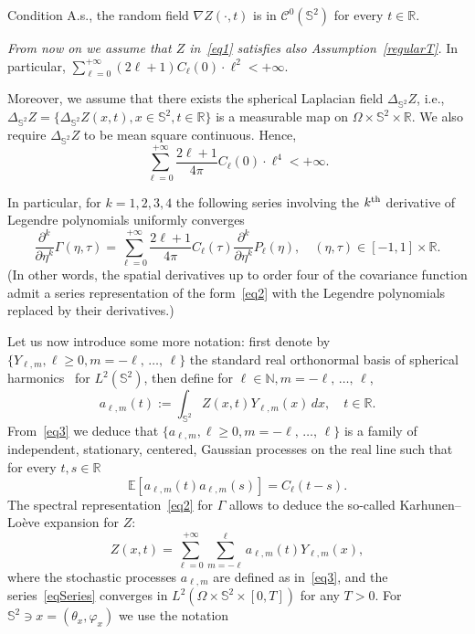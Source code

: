 \documentclass[10pt]{amsart}
\theoremstyle{definition}\newtheorem{defi}[theo]{Definition}\newtheorem{rema}[theo]{Remark}\newtheorem{exam}[theo]{Example}\newtheorem{exem}[theo]{Example}\newtheorem{nota}[theo]{Notation}
\newcommand{\clC}{\mathcal{C}}
\newcommand{\bbS}{\mathbb{S}}
\newcommand{\bbR}{\mathbb{R}}
\newcommand{\bbE}{\mathbb{E}}
\newcommand{\bbN}{\mathbb{N}}
\begin{document}
\begin{enonce}{Condition}\label{regularT}
A.s., the random field $\nabla Z(\cdot,t)$ is in $\clC^0(\bbS^2)$ for every $t\in \bbR$.
\end{enonce}
\emph{From now on we assume that $Z$ in~\eqref{eq1} satisfies also Assumption~\ref{regularT}. } In particular, $\sum_{\ell=0}^{+\infty} (2\ell+1) C_\ell(0) \cdot \ell^2 < +\infty$.

Moreover, we assume that there exists the spherical Laplacian field $\Delta_{\bbS^2} Z$, i.e., $\Delta_{\bbS^2} Z = \{ \Delta_{\bbS^2} Z(x,t), x\in \bbS^2, t\in \bbR\}$ is a measurable map on $\Omega\times \bbS^2\times \bbR$. We also require $\Delta_{\bbS^2} Z$ to be mean square continuous. Hence,
\begin{equation}\label{eqConv}
\sum_{\ell = 0}^{+\infty} \frac{2\ell+1}{4\pi} C_\ell(0) \cdot \ell^4 < +\infty.
\end{equation}

In particular, for $k=1,2,3,4$ the following series involving the $k^{\rm th}$ derivative of Legendre polynomials uniformly converges
\begin{equation}\label{eqDer}
\frac{\partial^k}{\partial \eta^k}\Gamma(\eta, \tau)= \sum_{\ell=0}^{+\infty}
\frac{2\ell+1}{4\pi} C_\ell(\tau) \frac{\partial^k}{\partial \eta^k} P_\ell(\eta),\quad (\eta, \tau) \in [-1,1] \times \bbR.
\end{equation}
(In other words, the spatial derivatives up to order four of the covariance function admit a series representation of the form~\eqref{eq2} with the Legendre polynomials replaced by their derivatives.)



Let us now introduce some more notation: first denote by $\{ Y_{\ell,m}, \ell \ge 0, m=-\ell,\, \dots,\, \ell\}$ the standard real orthonormal basis of spherical harmonics~\cite[Section~3.4]{MaPeCUP} for $ L^2(\bbS^2)$, then define for $\ell\in \bbN, m=-\ell,\,\dots,\,\ell$,
\begin{equation}\label{eq3}
a_{\ell,m}(t) := \int_{\bbS^2} Z(x,t) Y_{\ell,m}(x)\,dx,\quad t\in
\bbR.
\end{equation}
From~\eqref{eq3} we deduce that $\{ a_{\ell,m}, \ell \ge 0, m=-\ell,\,
\dots,\,\ell\}$ is a family of independent, stationary, centered, Gaussian processes on the real line such that for every $t,s \in \bbR$
\begin{equation*}
\bbE[a_{\ell,m}(t) a_{\ell,m}(s)] = C_\ell(t-s).
\end{equation*}
The spectral representation~\eqref{eq2} for $\Gamma$ allows to deduce the so-called Karhunen--Lo\`eve expansion for $Z$:
\begin{equation}\label{eqSeries}
Z(x,t) = \sum_{\ell =0}^{+\infty} \sum_{m=-\ell}^\ell a_{\ell,m}(t) Y_{\ell,m}(x),
\end{equation}
where the stochastic processes $a_{\ell,m}$ are defined as in~\eqref{eq3}, and the series~\eqref{eqSeries} converges in $L^2(\Omega \times \bbS^2
\times [0,T])$ for any $T>0$. For $\bbS^2\ni x=(\theta_x, \varphi_x)$ we use the notation
\end{document}
